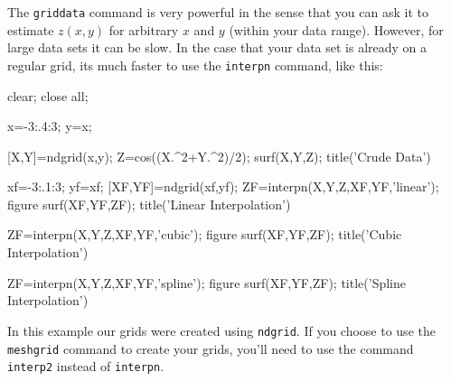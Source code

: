 The {\tt griddata} command is very powerful in the sense
that you can ask it to estimate $z(x,y)$ for arbitrary $x$ and $y$ (within
your data range).  However, for large data sets it can be slow.  In the
case that your data set is already on a regular grid, its much faster to
use the {\tt interpn} command, like this:
\begin{codeexample}
\begin{VerbatimOut}{\listingFile}
clear; close all;

x=-3:.4:3; y=x;

[X,Y]=ndgrid(x,y);
Z=cos((X.^2+Y.^2)/2);
surf(X,Y,Z);
title('Crude Data')


xf=-3:.1:3;
yf=xf;
[XF,YF]=ndgrid(xf,yf);
ZF=interpn(X,Y,Z,XF,YF,'linear');
figure
surf(XF,YF,ZF);
title('Linear Interpolation')


ZF=interpn(X,Y,Z,XF,YF,'cubic');
figure
surf(XF,YF,ZF);
title('Cubic Interpolation')


ZF=interpn(X,Y,Z,XF,YF,'spline');
figure
surf(XF,YF,ZF);
title('Spline Interpolation')
\end{VerbatimOut}
\end{codeexample}

In this example our grids were created using {\tt ndgrid}.  If you choose
to use the {\tt meshgrid} command to create your grids, you'll need
to use the command {\tt interp2} instead of {\tt interpn}.
